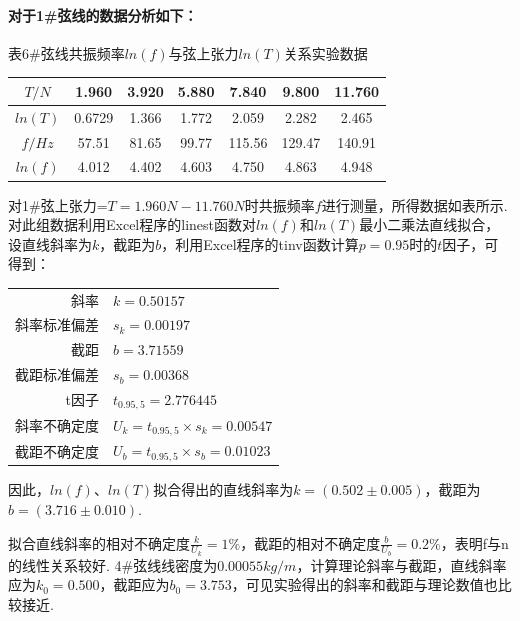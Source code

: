 \documentclass[UTF8]{ctexart}
\begin{document}
\paragraph{对于1\#弦线的数据分析如下：}
\begin{center}
{\kaishu 表6\#弦线共振频率$ln(f)$与弦上张力$ln(T)$关系实验数据}
\begin{tabular}{|c|c|c|c|c|c|c|}
\hline
	$T/N$&1.960&3.920&5.880&7.840&9.800&11.760\\
\hline
	$ln(T)$&0.6729&1.366&1.772&2.059&2.282&2.465\\
\hline
	$f/Hz$&57.51&81.65&99.77&115.56&129.47&140.91\\
\hline
	$ln(f)$&4.012&4.402&4.603&4.750&4.863&4.948\\
\hline
\end{tabular}
\end{center}
\par 对1\#弦上张力=${T} = 1.960N - 11.760N$时共振频率$f$进行测量，所得数据如表所示. 对此组数据利用Excel程序的linest函数对$ln(f)$和$ln(T)$最小二乘法直线拟合，设直线斜率为$k$，截距为$b$，利用Excel程序的tinv函数计算$p = 0.95$时的$t$因子，可得到：\par
\begin{center}\begin{tabular}{r l}
{斜率}& {$k=0.50157$}\\
{斜率标准偏差}& {$s_k=0.00197$}\\
{截距}&{$b=3.71559$}\\
{截距标准偏差}&{$s_b=0.00368$}\\
{t因子}& {$t_{0.95,5}=2.776445$}\\
{斜率不确定度}& {$U_k=t_{0.95,5}\times s_k = 0.00547$}\\
{截距不确定度}& {$U_b=t_{0.95,5}\times s_b = 0.01023$}
\end{tabular}\end{center}
因此，$ln(f)$、$ln(T)$拟合得出的直线斜率为$k=(0.502\pm0.005)$，截距为$b=(3.716\pm0.010).$\par
\begin{figure}\centering{}
\end{figure}
拟合直线斜率的相对不确定度$\frac{k}{U_k} = 1\%$，截距的相对不确定度$\frac{b}{U_b} = 0.2\%$，表明f与n的线性关系较好. 4\#弦线线密度为$0.00055kg/m$，计算理论斜率与截距，直线斜率应为$k_0=0.500$，截距应为$b_0=3.753$，可见实验得出的斜率和截距与理论数值也比较接近.
\end{document}
